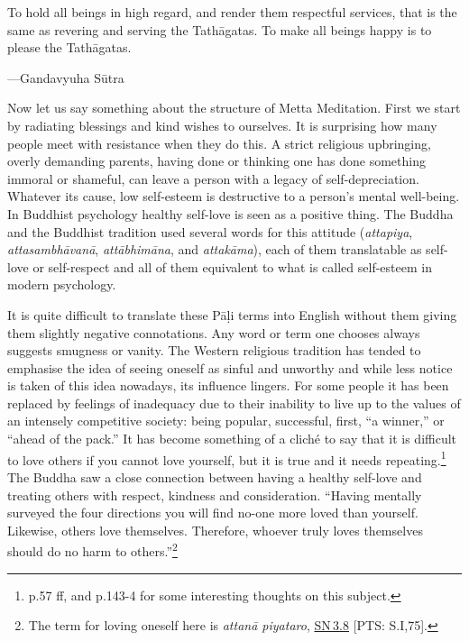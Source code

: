 \documentclass[10pt, openright]{book}
\newenvironment{epigram-2}%
{%
\setstretch{1.4}
\vspace{1em}
\noindent
\quoting[leftmargin=2cm,rightmargin=2cm]%
\begin{itshape}
\large
}%
{\end{itshape}\endquoting
}%
\newenvironment{epigram-2-cite}%
{%
\quoting[leftmargin=2cm,rightmargin=2cm]%
\noindent\normal\hspace*{\fill} 
}%
{\endquoting
}%
\begin{document}
\begin{epigram-2}
To hold all beings in high regard, and render them respectful services, that is the same as revering and serving the Tathāgatas. To make all beings happy is to please the Tathāgatas.
\end{epigram-2}
\begin{epigram-2-cite}
—Gandavyuha Sūtra
\end{epigram-2-cite}

Now let us say something about the structure of Metta Meditation. First we start by radiating blessings and kind wishes to ourselves. It is surprising how many people meet with resistance when they do this. A strict religious upbringing, overly demanding parents, having done or thinking one has done something immoral or shameful, can leave a person with a legacy of self-depreciation. Whatever its cause, low self-esteem is destructive to a person’s mental well-being. In Buddhist psychology healthy self-love is seen as a positive thing. The Buddha and the Buddhist tradition used several words for this attitude (\textit{attapiya}, \textit{attasambhāvanā}, \textit{attābhimāna}, and \textit{attakāma}), each of them translatable as self-love or self-respect and all of them equivalent to what is called self-esteem in modern psychology.


It is quite difficult to translate these Pāḷi terms into English without them giving them slightly negative connotations. Any word or term one chooses always suggests smugness or vanity. The Western religious tradition has tended to emphasise the idea of seeing oneself as sinful and unworthy and while less notice is taken of this idea nowadays, its influence lingers. For some people it has been replaced by feelings of inadequacy due to their inability to live up to the values of an intensely competitive society: being popular, successful, first, “a winner,” or “ahead of the pack.” It has become something of a cliché to say that it is difficult to love others if you cannot love yourself, but it is true and it needs repeating.\footnote {\cite{Fromm 1956} p.57 ff, and \cite{Singer 2009e} p.143-4 for some interesting thoughts on this subject.} The Buddha saw a close connection between having a healthy self-love and treating others with respect, kindness and consideration. “Having mentally surveyed the four directions you will find no-one more loved than yourself. Likewise, others love themselves. Therefore, whoever truly loves themselves should do no harm to others.”\footnote {The term for loving oneself here is \textit{attanā piyataro}, \href{https://suttacentral.net/sn3.8/en/sujato}{SN 3.8} [PTS: S.I,75].}
\end{document}
